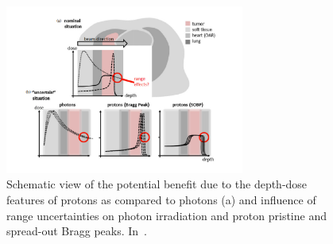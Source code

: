 \begin{figure}[!htbp]
\centering
\includegraphics[width=0.7\textwidth]{03_GraphicFiles/chapter1_Introduction/rangeUnc.pdf}
\caption{Schematic view of the potential benefit due to the depth-dose features of protons as compared to photons (a) and influence of range uncertainties on photon irradiation and proton pristine and spread-out Bragg peaks. In~\cite{Knopf2013}.}
\label{chap1::fig::rangeUnc}
\end{figure} 

